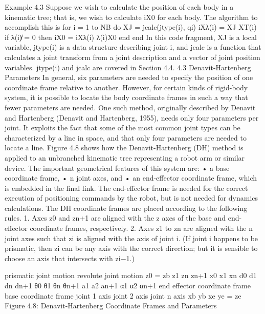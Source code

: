 Example 4.3 Suppose we wish to calculate the position of each body in a kinematic tree; that is, we wish to calculate iX0 for each body. The algorithm to accomplish this is for i = 1 to NB do XJ = jcalc(jtype(i), qi) iXλ(i) = XJ XT(i) if λ(i)̸ = 0 then iX0 = iXλ(i) λ(i)X0 end end In this code fragment, XJ is a local variable, jtype(i) is a data structure describing joint i, and jcalc is a function that calculates a joint transform from a joint description and a vector of joint position variables. jtype(i) and jcalc are covered in Section 4.4. 4.3 Denavit-Hartenberg Parameters In general, six parameters are needed to specify the position of one coordinate frame relative to another. However, for certain kinds of rigid-body system, it is possible to locate the body coordinate frames in such a way that fewer parameters are needed. One such method, originally described by Denavit and Hartenberg (Denavit and Hartenberg, 1955), needs only four parameters per joint. It exploits the fact that some of the most common joint types can be characterized by a line in space, and that only four parameters are needed to locate a line. Figure 4.8 shows how the Denavit-Hartenberg (DH) method is applied to an unbranched kinematic tree representing a robot arm or similar device. The important geometrical features of this system are: • a base coordinate frame, • n joint axes, and • an end-effector coordinate frame, which is embedded in the final link. The end-effector frame is needed for the correct execution of positioning commands by the robot, but is not needed for dynamics calculations. The DH coordinate frames are placed according to the following rules. 1. Axes z0 and zn+1 are aligned with the z axes of the base and end-effector coordinate frames, respectively. 2. Axes z1 to zn are aligned with the n joint axes such that zi is aligned with the axis of joint i. (If joint i happens to be prismatic, then zi can be any axis with the correct direction; but it is sensible to choose an axis that intersects with zi−1.)

prismatic joint motion revolute joint motion z0 = zb z1 zn zn+1 x0 x1 xn d0 d1 dn dn+1 θ0 θ1 θn θn+1 a1 a2 an+1 α1 α2 αn+1 end effector coordinate frame base coordinate frame joint 1 axis joint 2 axis joint n axis xb yb xe ye = ze Figure 4.8: Denavit-Hartenberg Coordinate Frames and Parameters

